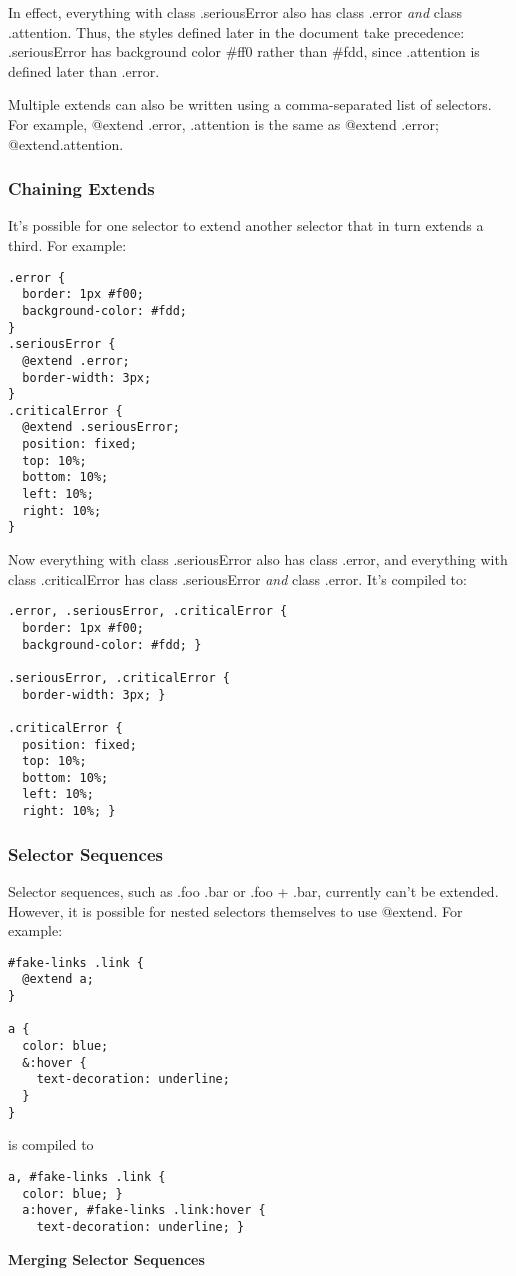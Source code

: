 \documentclass[9pt]{article}
\begin{document}
 In effect, everything with class .seriousError also has class .error \emph{and}
 class .attention. Thus, the styles defined later in the document take precedence: .seriousError has background color \#ff0 rather than \#fdd, since .attention is defined later than .error.


 Multiple extends can also be written using a comma-separated list of selectors. For example, @extend .error, .attention is the same as @extend .error; @extend.attention.
\subsubsection{Chaining Extends}


 It’s possible for one selector to extend another selector that in turn extends a third. For example:
\begin{verbatim}
.error {
  border: 1px #f00;
  background-color: #fdd;
}
.seriousError {
  @extend .error;
  border-width: 3px;
}
.criticalError {
  @extend .seriousError;
  position: fixed;
  top: 10%;
  bottom: 10%;
  left: 10%;
  right: 10%;
}
\end{verbatim}


 Now everything with class .seriousError also has class .error, and everything with class .criticalError has class .seriousError \emph{and}
 class .error. It’s compiled to:
\begin{verbatim}
.error, .seriousError, .criticalError {
  border: 1px #f00;
  background-color: #fdd; }

.seriousError, .criticalError {
  border-width: 3px; }

.criticalError {
  position: fixed;
  top: 10%;
  bottom: 10%;
  left: 10%;
  right: 10%; }
\end{verbatim}
\subsubsection{Selector Sequences}


 Selector sequences, such as .foo .bar or .foo + .bar, currently can’t be extended. However, it is possible for nested selectors themselves to use @extend. For example:
\begin{verbatim}
#fake-links .link {
  @extend a;
}

a {
  color: blue;
  &:hover {
    text-decoration: underline;
  }
}
\end{verbatim}


 is compiled to
\begin{verbatim}
a, #fake-links .link {
  color: blue; }
  a:hover, #fake-links .link:hover {
    text-decoration: underline; }
\end{verbatim}
\textbf{Merging Selector Sequences}
\end{document}

